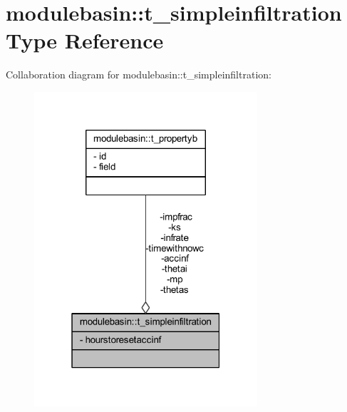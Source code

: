 \hypertarget{structmodulebasin_1_1t__simpleinfiltration}{}\section{modulebasin\+:\+:t\+\_\+simpleinfiltration Type Reference}
\label{structmodulebasin_1_1t__simpleinfiltration}


Collaboration diagram for modulebasin\+:\+:t\+\_\+simpleinfiltration\+:\nopagebreak
\begin{figure}[H]
\begin{center}
\leavevmode
\includegraphics[width=235pt]{structmodulebasin_1_1t__simpleinfiltration__coll__graph}
\end{center}
\end{figure}
